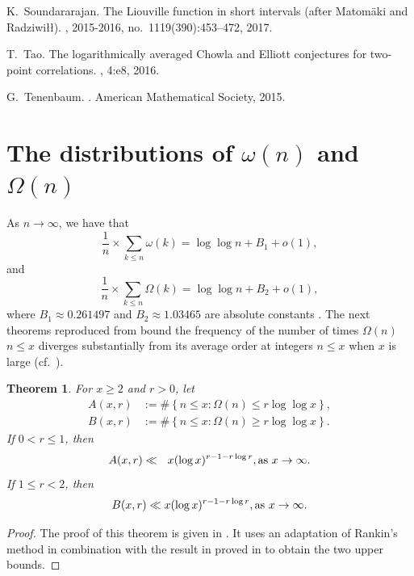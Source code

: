 \documentclass[11pt,reqno,a4letter]{article}
\numberwithin{equation}{section}
\numberwithin{figure}{section}
\numberwithin{table}{section}
\newcommand{\cf}{cf.~}
\theoremstyle{plain}
\newtheorem{theorem}{Theorem}
\numberwithin{theorem}{section}
\theoremstyle{definition}
\theoremstyle{remark}
\newcommand{\mathtext}[1]{\text{\rm #1}}
\begin{document}
\begin{thebibliography}{10}
K.~Soundararajan.
\newblock The {L}iouville function in short intervals (after {M}atom{\"{a}}ki
  and {R}adziwi{\l}{\l}).
, 2015-2016, no.~1119(390):453--472, 2017.

T.~Tao.
\newblock The logarithmically averaged {C}howla and {E}lliott conjectures for
  two-point correlations.
, 4:e8, 2016.

G.~Tenenbaum.
.
\newblock American Mathematical Society, 2015.

\end{thebibliography}

\appendix
{}
\setcounter{section}{0} 
\renewcommand{\thesection}{\Alph{section}} 
\newpage

\section{The distributions of $\omega(n)$ and $\Omega(n)$} 
\label{subSection_TheKnownDistsOfThePrimeOmegaFunctions_IntroResults_v1} 

As $n \rightarrow \infty$, we have that 
$$\frac{1}{n} \times \sum_{k \leq n} \omega(k) = \log\log n + B_1 + o(1),$$ 
and 
$$\frac{1}{n} \times \sum_{k \leq n} \Omega(k) = \log\log n + B_2 + o(1),$$ 
where $B_1 \approx 0.261497$ and $B_2 \approx 1.03465$ are 
absolute constants \cite[\S 22.10]{HARDYWRIGHT}. 
The next theorems reproduced from \cite[\S 7.4]{MV} bound the frequency of the 
number of times $\Omega(n)$ $n \leq x$ 
diverges substantially from its average order at integers $n \leq x$ 
when $x$ is large 
(\cf \cite{ERDOS-KAC-REF,BILLINGSLY-CLT-PRIMEDIVFUNC}). 

\begin{theorem} 
\label{theorem_MV_Thm7.20-init_stmt} 
For $x \geq 2$ and $r > 0$, let 
\begin{align*} 
A(x, r) & := \#\left\{n \leq x: \Omega(n) \leq r \log\log x\right\}, \\ 
B(x, r) & := \#\left\{n \leq x: \Omega(n) \geq r \log\log x\right\}. 
\end{align*} 
If $0 < r \leq 1$, then 
\[
A(x, r) \ll\phantom{_R} x (\log x)^{r-1 - r\log r}, \mathtext{ as } x \rightarrow \infty. 
\]
If $1 \leq r < 2$, then 
\[
B(x, r) \ll x (\log x)^{r-1-r \log r}, \mathtext{ as } x \rightarrow \infty. 
\]
\end{theorem} 
\begin{proof}
The proof of this theorem is given in \cite[Thm.~7.20; \S 7.4]{MV}. 
It uses an adaptation of Rankin's method in combination with the result 
in proved in \cite[Thm.~7.18; \S 7.4]{MV} to obtain the two upper bounds. 
\end{proof}
\end{document}
